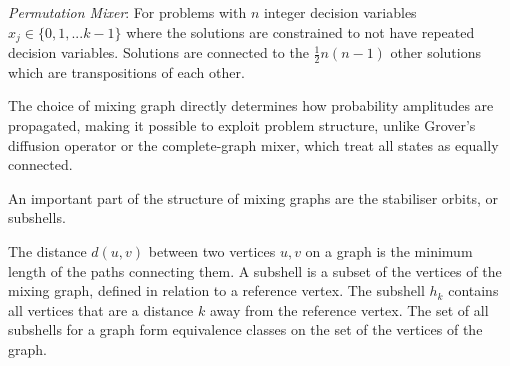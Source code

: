 \textit{Permutation Mixer}: For problems with $n$ integer decision variables $x_j\in\{0,1,...k-1\}$ where the solutions are constrained to not have repeated decision variables. Solutions are connected to the $\frac{1}{2}n(n-1)$ other solutions which are transpositions of each other.

The choice of mixing graph directly determines how probability amplitudes are propagated, making it possible to exploit problem structure, unlike Grover's diffusion operator or the complete-graph mixer, which treat all states as equally connected.

An important part of the structure of mixing graphs are the stabiliser orbits, or subshells.

The distance $d(u,v)$ between two vertices $u,v$ on a graph is the minimum length of the paths connecting them. A subshell is a subset of the vertices of the mixing graph, defined in relation to a reference vertex. The subshell $h_k$ contains all vertices that are a distance $k$ away from the reference vertex. The set of all subshells for a graph form equivalence classes on the set of the vertices of the graph.

